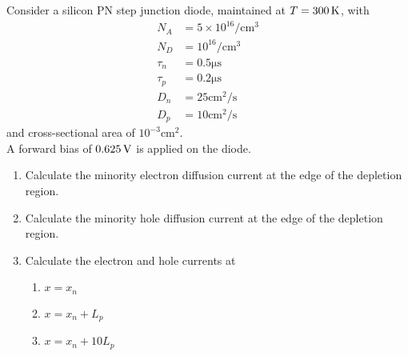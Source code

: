 \documentclass[fleqn, a4paper, 10pt, oneside]{amsart}
\theoremstyle{definition}
\theoremstyle{theorem}
\begin{document}
\begin{question}
	Consider a silicon PN step junction diode, maintained at $T = 300 \kelvin$, with
	\begin{align*}
		N_A    & = 5 \times 10^{16} \si{\per\centi\metre\cubed} \\
		N_D    & = 10^{16} \si{\per\centi\metre\cubed}          \\
		\tau_n & = 0.5 \si{\micro\second}                       \\
		\tau_p & = 0.2 \si{\micro\second}                       \\
		D_n    & = 25 \si{\centi\metre\squared\per\second}      \\
		D_p    & = 10 \si{\centi\metre\squared\per\second}
	\end{align*}
	and cross-sectional area of $10^{-3} \si{\centi\metre\squared}$.\\
	A forward bias of $0.625 \volt$ is applied on the diode.
	\begin{enumerate}
		\item
			Calculate the minority electron diffusion current at the edge of the depletion region.
		\item
			Calculate the minority hole diffusion current at the edge of the depletion region.
		\item
			Calculate the electron and hole currents at
			\begin{enumerate}
				\item $x = x_n$
				\item $x = x_n + L_p$
				\item $x = x_n + 10 L_p$
			\end{enumerate}
	\end{enumerate}
\end{question}
\end{document}
